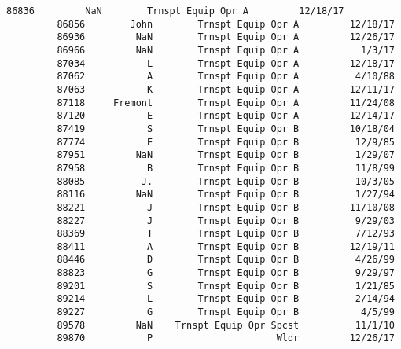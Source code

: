 \documentclass[11pt]{article}
\begin{document}
\begin{Verbatim}[commandchars=\\\{\}]
         86836         NaN        Trnspt Equip Opr A         12/18/17   
         86856        John        Trnspt Equip Opr A         12/18/17   
         86936         NaN        Trnspt Equip Opr A         12/26/17   
         86966         NaN        Trnspt Equip Opr A           1/3/17   
         87034           L        Trnspt Equip Opr A         12/18/17   
         87062           A        Trnspt Equip Opr A          4/10/88   
         87063           K        Trnspt Equip Opr A         12/11/17   
         87118     Fremont        Trnspt Equip Opr A         11/24/08   
         87120           E        Trnspt Equip Opr A         12/14/17   
         87419           S        Trnspt Equip Opr B         10/18/04   
         87774           E        Trnspt Equip Opr B          12/9/85   
         87951         NaN        Trnspt Equip Opr B          1/29/07   
         87958           B        Trnspt Equip Opr B          11/8/99   
         88085          J.        Trnspt Equip Opr B          10/3/05   
         88116         NaN        Trnspt Equip Opr B          1/27/94   
         88221           J        Trnspt Equip Opr B         11/10/08   
         88227           J        Trnspt Equip Opr B          9/29/03   
         88369           T        Trnspt Equip Opr B          7/12/93   
         88411           A        Trnspt Equip Opr B         12/19/11   
         88446           D        Trnspt Equip Opr B          4/26/99   
         88823           G        Trnspt Equip Opr B          9/29/97   
         89201           S        Trnspt Equip Opr B          1/21/85   
         89214           L        Trnspt Equip Opr B          2/14/94   
         89227           G        Trnspt Equip Opr B           4/5/99   
         89578         NaN    Trnspt Equip Opr Spcst          11/1/10   
         89870           P                      Wldr         12/26/17   
         

\end{Verbatim}
\end{document}
